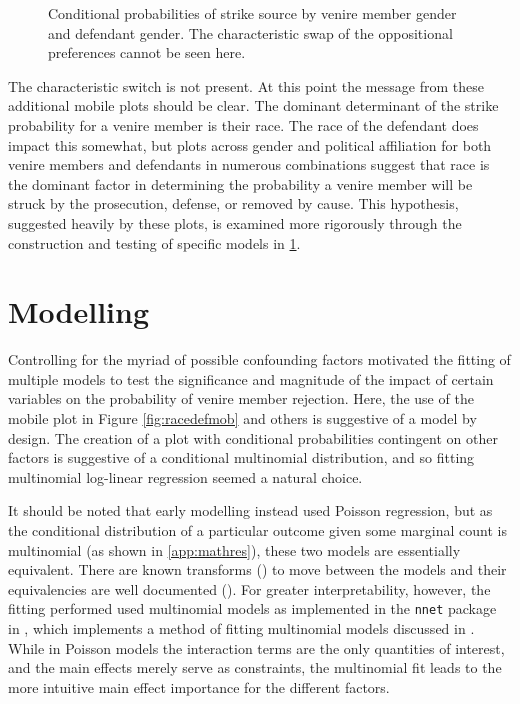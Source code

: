 \begin{figure}[h!]
  \centering
  \caption[Strike Source by Race and Gender (Sunshine)]
  {Conditional probabilities of strike source by venire member gender and defendant gender. The characteristic swap of the
    oppositional preferences cannot be seen here.} \label{fig:gengen}
\end{figure}

The characteristic switch is not present. At this point the message from these additional mobile plots should be clear. The
dominant determinant of the strike probability for a venire member is their race. The race of the defendant does impact this
somewhat, but plots across gender and political affiliation for both venire members and defendants in numerous combinations
suggest that race is the dominant factor in determining the probability a venire member will be struck by the prosecution,
defense, or removed by cause. This hypothesis, suggested heavily by these plots, is examined more rigorously through the
construction and testing of specific models in \ref{sec:mods}.

\section{Modelling} \label{sec:mods}

Controlling for the myriad of possible confounding factors motivated the fitting of multiple models to test the significance and
magnitude of the impact of certain variables on the probability of venire member rejection. Here, the use of the mobile plot in
Figure \ref{fig:racedefmob} and others is suggestive of a model by design. The creation of a plot with conditional probabilities
contingent on other factors is suggestive of a conditional multinomial distribution, and so fitting multinomial log-linear
regression seemed a natural choice.

It should be noted that early modelling instead used Poisson regression, but as the conditional distribution of a particular
outcome given some marginal count is multinomial (as shown in \ref{app:mathres}), these two models are essentially
equivalent. There are known transforms (\cite{baker1994}) to move between the models and their equivalencies are well documented
(\cite{lang1996}). For greater interpretability, however, the fitting performed used multinomial models as implemented in the
\texttt{nnet} package in \Rp, which implements a method of fitting multinomial models discussed in \cite{nnet}. While in Poisson
models the interaction terms are the only quantities of interest, and the main effects merely serve as constraints, the
multinomial fit leads to the more intuitive main effect importance for the different factors.

